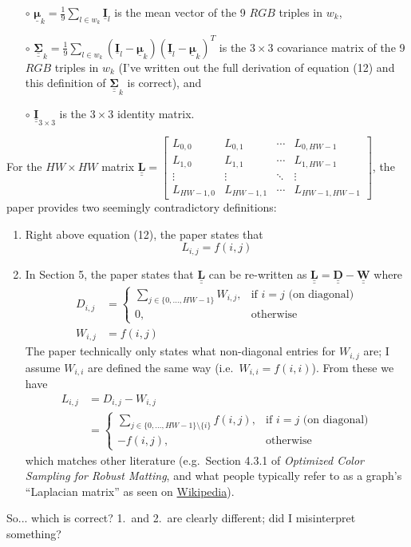 \documentclass{article}
\def\vec#1{\underline{\mathbf{#1}}}
\def\vecbs#1{\underline{\boldsymbol{#1}}}
\def\mat#1{\underline{\underline{\mathbf{#1}}}}
\def\matbs#1{\underline{\underline{\boldsymbol{#1}}}}
\begin{document}
\begin{itemize}
\begin{itemize}
        \item[$\circ$] $\vecbs\mu_k=\frac19\sum_{l\in w_k}\vec{I}_l$ is the mean vector of the 9 $RGB$ triples in $w_k$,
        \item[$\circ$] $\matbs\Sigma_k = \frac19\sum_{l\in w_k} \left(\vec{I}_l-\vecbs\mu_k\right)\left(\vec{I}_l-\vecbs\mu_k\right)^T$ is the $3\times 3$ covariance matrix of the 9 $RGB$ triples in $w_k$ (I've written out the full derivation of equation (12) and this definition of $\matbs\Sigma_k$ is correct), and
        \item[$\circ$] $\mat{I}_{3\times3}$ is the $3\times 3$ identity matrix.
    \end{itemize}
\end{itemize}
For the $HW\times HW$ matrix $\mat{L} = \begin{bmatrix}
    L_{0,0} & L_{0,1} & \cdots & L_{0, HW-1}\\
    L_{1,0} & L_{1,1} & \cdots & L_{1, HW-1}\\
    \vdots & \vdots & \ddots & \vdots\\
    L_{HW-1,0} & L_{HW-1,1} & \cdots & L_{HW-1, HW-1}
\end{bmatrix}$, the paper provides two seemingly contradictory definitions:
\begin{enumerate}
    \item Right above equation (12), the paper states that
    $$L_{i,j} = f(i,j)$$
    \item In Section 5, the paper states that $\mat{L}$ can be re-written as $\mat{L}=\mat{D}-\mat{W}$ where
    \begin{align*}
        D_{i,j} &= \begin{cases}
            \sum_{j\in\{0,\dots,HW-1\}} W_{i,j},&\text{if $i=j$ (on diagonal)}\\
            0,&\text{otherwise}
        \end{cases}\\
        W_{i,j} &= f(i,j)
    \end{align*}
    The paper technically only states what non-diagonal entries for $W_{i,j}$ are; I assume $W_{i,i}$ are defined the same way (i.e.\ $W_{i,i}=f(i,i)$). From these we have
    \begin{align*}
        L_{i,j} &= D_{i,j} - W_{i,j}\\
        &= \begin{cases}
            \sum_{j\in\{0,\dots,HW-1\}\setminus\{i\}} f(i,j),&\text{if $i=j$ (on diagonal)}\\
            -f(i,j),&\text{otherwise}
        \end{cases}
    \end{align*}
    which matches other literature (e.g.\ Section 4.3.1 of \emph{Optimized Color Sampling for Robust Matting}, and what people typically refer to as a graph's ``Laplacian matrix'' as seen on \href{https://en.wikipedia.org/wiki/Laplacian_matrix#Laplacian_matrix}{Wikipedia}).
\end{enumerate}
So... which is correct? 1.\ and 2.\ are clearly different; did I misinterpret something?
\end{document}

